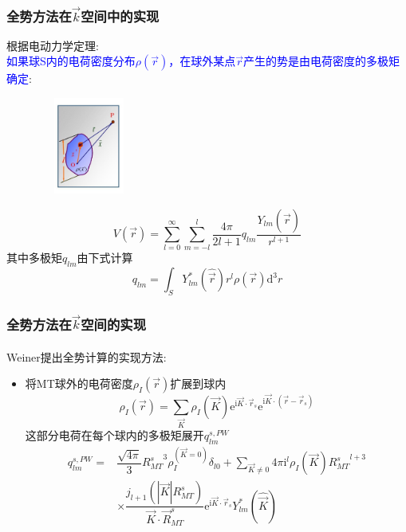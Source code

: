 \documentclass[cjk,slidestop,compress,mathserif,blue]{beamer}
\newcommand{\upcite}[1]{\hspace{0ex}\textsuperscript{\cite{#1}}} %
\begin{document}
\frame
{
\frametitle{全势方法在$\vec k$空间中的实现}
根据电动力学定理:\\\textcolor{blue}{如果球\textrm{S}内的电荷密度分布$\rho(\vec r)$，在球外某点$\vec r$产生的势是由电荷密度的多极矩确定}:
\begin{figure}[h!]
\vspace*{-15pt}
\centering
\includegraphics[height=1.25in,width=1.32in,viewport=1 22 507 575,clip]{Figures/potential_multipole.jpg}
\label{Potential-multipole}
\end{figure}
\begin{displaymath}
	V(\vec r)=\sum_{l=0}^{\infty}\sum_{m=-l}^{l}\dfrac{4\pi}{2l+1}q_{lm}\dfrac{Y_{lm}(\hat{\vec r})}{r^{l+1}}
\end{displaymath}
其中多极矩$q_{lm}$由下式计算
\begin{displaymath}
	q_{lm}=\int_SY_{lm}^{\ast}(\hat{\vec r})r^l\rho(\vec r)\mathrm{d}^3r
\end{displaymath}
}

\frame
{
	\frametitle{全势方法在$\vec k$空间的实现}
\textrm{Weiner}提出全势计算的实现方法\upcite{JMP22-2433_1981}:~\\
\begin{itemize}
	\item 将\textrm{MT}球外的电荷密度$\rho_I(\vec r)$扩展到球内
	\begin{displaymath}
		\rho_I(\vec r)=\sum_{\vec K}\rho_I(\vec K)\mathrm{e}^{\mathrm{i}\vec K\cdot\vec r_s}\mathrm{e}^{\mathrm{i}\vec K\cdot(\vec r-\vec r_s)}
	\end{displaymath}
	这部分电荷在每个球内的多极矩展开$q_{lm}^{s,PW}$
	\begin{displaymath}
		\begin{aligned}
			q_{lm}^{s,PW}=&\dfrac{\sqrt{4\pi}}3{R_{MT}^s}^3\rho_I^{(\vec K=0)}\delta_{l0}+\sum_{\vec K\neq0}4\pi\mathrm{i}^l\rho_I(\vec K){R_{MT}^s}^{l+3}\\
			&\times\dfrac{j_{l+1}(|\vec K|R_{MT}^s)}{\vec K\cdot\vec R_{MT}^s}\mathrm{e}^{\mathrm{i}\vec K\cdot\vec r_s}Y_{lm}^{\ast}(\hat{\vec K})
		\end{aligned}
	\end{displaymath}
\end{itemize}
}
\end{document}
